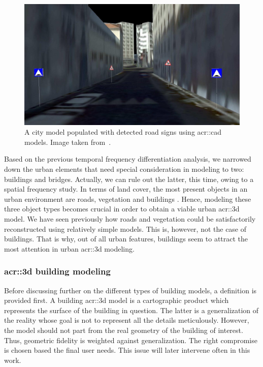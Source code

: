             \begin{figure}[htpb]
                \centering
                \includegraphics[width=\textwidth]{images/introduction/modeling_road_signs}
                \caption[
                    A city model populated with detected road signs using \acrshort*{acr::cad} models.
                ]{
                    \label{fig::3d_road_signs_models}
                    A city model populated with detected road signs using \gls{acr::cad} models.
                    Image taken from~\parencite{soheilian2013detection}.
                }
            \end{figure}

            Based on the previous temporal frequency differentiation analysis, we narrowed down the urban elements that need special consideration in modeling to two: buildings and bridges. 
            Actually, we can rule out the latter, this time, owing to a spatial frequency study.
            In terms of land cover, the most present objects in an urban environment are roads, vegetation and buildings \addref.
            Hence, modeling these three object types becomes crucial in order to obtain a viable urban \gls{acr::3d} model.
            We have seen previously how roads and vegetation could be satisfactorily reconstructed using relatively simple models.
            This is, however, not the case of buildings.
            That is why, out of all urban features, buildings seem to attract the most attention in urban \gls{acr::3d} modeling.

        \subsubsection{\texorpdfstring{\gls*{acr::3d}}{3D} building modeling}
            Before discussing further on the different types of building models, a definition is provided first.
            A building \gls{acr::3d} model is a cartographic product which represents the surface of the building in question.
            The latter is a generalization of the reality whose goal is not to represent all the details meticulously.
            However, the model should not part from the real geometry of the building of interest.
            Thus, geometric fidelity is weighted against generalization.
            The right compromise is chosen based the final user needs.
            This issue will later intervene often in this work.

